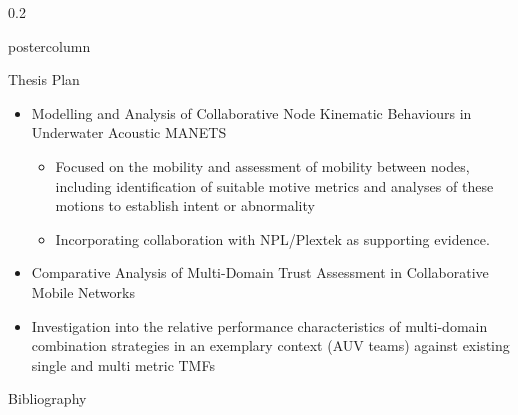 \documentclass[final,hyperref={pdfpagelabels=false}]{beamer}
\def\colwidth{0.2\linewidth}
\begin{document}
\begin{frame}[fragile]
\begin{columns}[T]
\begin{column}{\colwidth}
\begin{beamercolorbox}[center,wd=\textwidth]{postercolumn}
\begin{minipage}[T]{.98\textwidth}
{\begin{block}{Thesis Plan}
\begin{itemize}
								\item Modelling and Analysis of Collaborative Node Kinematic Behaviours in Underwater Acoustic MANETS
								\begin{itemize}
									\item Focused on the mobility and assessment of mobility between nodes, including identification of suitable motive metrics and analyses of these motions to establish intent or abnormality
									\item Incorporating collaboration with NPL/Plextek as supporting evidence.
								\end{itemize}
								\item Comparative Analysis of Multi-Domain Trust Assessment in Collaborative Mobile Networks
								\item Investigation into the relative performance characteristics of multi-domain combination strategies in an exemplary context (AUV teams) against existing single and multi metric TMFs
							\end{itemize}
														
						\end{block}
												
												
												
												
						\begin{block}{Bibliography}						
							\printbibliography[title=References]%
						\end{block}
					}
				\end{minipage}
			\end{beamercolorbox}
		\end{column}
				
	\end{columns}
\end{frame}
\end{document}
